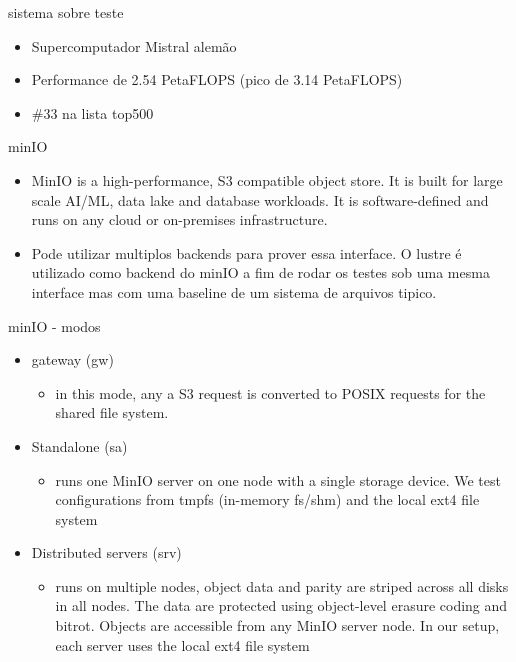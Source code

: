 \documentclass{beamer}
\begin{document}
\begin{frame}{sistema sobre teste}
	\begin{itemize}
		\item Supercomputador Mistral alemão
		\item Performance de 2.54 PetaFLOPS (pico de 3.14 PetaFLOPS)
		\item \#33 na lista top500
	\end{itemize}
\end{frame}
\begin{frame}{minIO}
	\begin{itemize}
		\item 	MinIO is a high-performance, S3 compatible object store. It is built for
		large scale AI/ML, data lake and database workloads. It is software-defined
		and runs on any cloud or on-premises infrastructure.
		\item	Pode utilizar multiplos backends para prover essa interface. O lustre é utilizado como backend do minIO a fim de rodar os testes sob uma mesma interface mas com uma baseline de um sistema de arquivos tipico.
	\end{itemize}
\end{frame}
\begin{frame}{minIO - modos}
	\begin{itemize}
		\item gateway (gw)
		\begin{itemize}
			\item in this mode, any a S3 request is converted to POSIX requests for the shared file system.
		\end{itemize}
		\item Standalone (sa)
		\begin{itemize}
			\item runs one MinIO server on one node with a single storage device. We
			test configurations from tmpfs (in-memory fs/shm) and the local ext4 file system
		\end{itemize}
		\item Distributed servers (srv)
		\begin{itemize}
			\item runs on multiple nodes, object data and parity are striped
			across all disks in all nodes. The data are protected using object-level erasure coding
			and bitrot. Objects are accessible from any MinIO server node. In our setup, each
			server uses the local ext4 file system
		\end{itemize}
	\end{itemize}
\end{frame}
\end{document}
